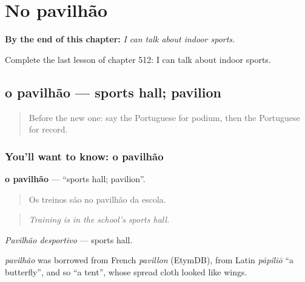 
\chapter{No pavilhão}
\label{ch:pt-no-pavilhao}

\begin{chapteropening}
\textbf{By the end of this chapter:} \emph{I can talk about indoor sports.}

Complete the last lesson of chapter 512: I can talk about indoor sports.
\end{chapteropening}

\section[o pavilhão]{o pavilhão — sports hall; pavilion}

\label{lesson:PT-C512-pavilhao}



\begin{quote}
Before the new one: say the Portuguese for podium, then the Portuguese for record.
\end{quote}

\subsection*{You'll want to know: o pavilhão}
\textbf{o pavilhão} — \textquotedblleft{}sports hall; pavilion\textquotedblright{}.

\begin{quote}
Os treinos são no pavilhão da escola.
\end{quote}

\begin{quote}
\emph{Training is in the school's sports hall.}
\end{quote}

\emph{Pavilhão desportivo} — sports hall.

\begin{cousinweb}
\emph{pavilhão} was borrowed from French \emph{pavillon} (EtymDB), from Latin \emph{pāpiliō} \textquotedblleft{}a butterfly\textquotedblright{}, and so \textquotedblleft{}a tent\textquotedblright{}, whose spread cloth looked like wings.
\end{cousinweb}

